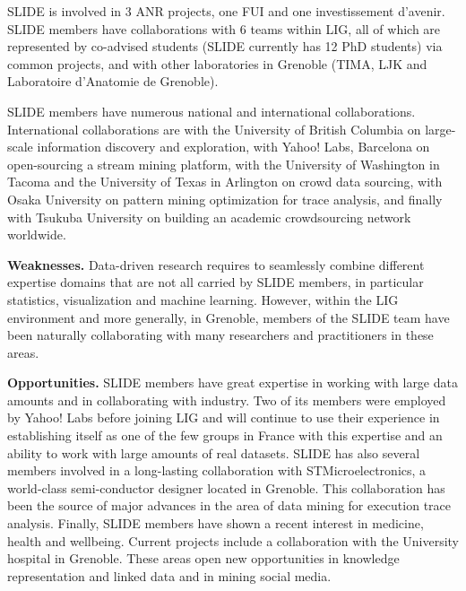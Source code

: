 SLIDE is involved in 3 ANR projects, one FUI and one investissement
d'avenir. SLIDE members have collaborations with 6 teams within LIG,
all of which are represented by co-advised students (SLIDE currently
has 12 PhD students) via common projects, and with other laboratories
in Grenoble (TIMA, LJK and Laboratoire d’Anatomie de Grenoble). 


SLIDE members have numerous national and international
collaborations. International collaborations are with the University
of British Columbia on large-scale information discovery and
exploration, with Yahoo! Labs, Barcelona on open-sourcing a stream
mining platform, with the University of Washington in Tacoma and the
University of Texas in Arlington on crowd data sourcing, with Osaka
University on pattern mining optimization for trace analysis, and
finally with Tsukuba University on building an academic crowdsourcing
network worldwide.

{\bf \noindent Weaknesses.}  Data-driven research requires to
seamlessly combine different expertise domains that are not all carried by
SLIDE members, in particular statistics, visualization and machine
learning. However, within the LIG environment and more generally, in
Grenoble, members of the SLIDE team have been naturally collaborating
with many researchers and practitioners in these areas.

{\bf \noindent Opportunities.}  SLIDE members have great expertise in
working with large data amounts and in collaborating with
industry. Two of its members were employed by Yahoo! Labs before
joining LIG and will continue to use their experience in establishing
itself as one of the few groups in France with this expertise and an
ability to work with large amounts of real datasets. SLIDE has also
several members involved in a long-lasting collaboration with
STMicroelectronics, a world-class semi-conductor designer located in
Grenoble. This collaboration has been the source of major advances in
the area of data mining for execution trace analysis. Finally, SLIDE
members have shown a recent interest in medicine, health and
wellbeing. Current projects include a collaboration with the
University hospital in Grenoble. These areas open new opportunities in
knowledge representation and linked data and in mining social
media.

